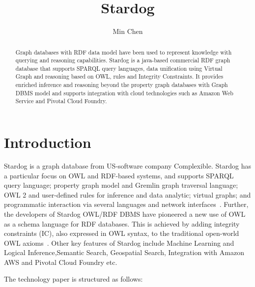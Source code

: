 \title{Stardog}


\author{Min Chen}

\begin{abstract}
	Graph databases with RDF data model have been used to represent 
	knowledge with querying and reasoning capabilities. Stardog is a 
	java-based commercial RDF graph database that supports SPARQL query 
	languages, data unification using Virtual Graph and reasoning based on 
	OWL, rules and Integrity Constraints. It provides enriched inference and 
	reasoning beyond the property graph databases with Graph DBMS model 
	and supports integration with cloud technologies such as Amazon Web 
	Service and Pivotal	Cloud Foundry.

\end{abstract}


\maketitle

\section{Introduction}

	Stardog is a graph database from US-software company
	Complexible. Stardog has a particular focus on OWL and RDF-based
	systems, and supports SPARQL query language; property graph model and 
	Gremlin graph traversal language; OWL 2 and user-defined rules for 
	inference and data analytic; virtual graphs; and
	programmatic interaction via several languages and network
	interfaces~\cite{hid-sp18-405-www-stardog-docs}. Further, the
	developers of Stardog OWL/RDF DBMS have pioneered a new use of OWL 
	as a schema language for RDF databases. This is achieved by adding
	integrity constraints (IC), also expressed in OWL syntax, to the traditional  
	open-world OWL axioms~\cite{hid-sp18-405-cer2012graphical-stardog}. 
	Other key features of Stardog include Machine Learning and Logical 
	Inference,Semantic Search, Geospatial Search, Integration with Amazon 
	AWS and Pivotal Cloud Foundry etc.\ 

	The technology paper is structured as follows:

